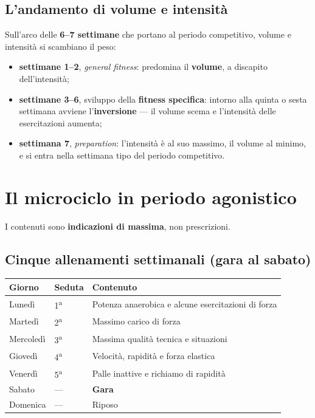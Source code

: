 \subsection{L'andamento di volume e intensità}

Sull'arco delle \textbf{6--7 settimane} che portano al periodo competitivo, volume e intensità si
scambiano il peso:

\begin{itemize}
  \item \textbf{settimane 1--2}, \textit{general fitness}: predomina il \textbf{volume}, a discapito
    dell'intensità;
  \item \textbf{settimane 3--6}, sviluppo della \textbf{fitness specifica}: intorno alla quinta o
    sesta settimana avviene l'\textbf{inversione} --- il volume scema e l'intensità delle
    esercitazioni aumenta;
  \item \textbf{settimana 7}, \textit{preparation}: l'intensità è al suo massimo, il volume al
    minimo, e si entra nella settimana tipo del periodo competitivo.
\end{itemize}

\section{Il microciclo in periodo agonistico}

I contenuti sono \textbf{indicazioni di massima}, non prescrizioni.

\subsection{Cinque allenamenti settimanali (gara al sabato)}

\begin{table}[htbp]
  \centering
  \small
  \renewcommand{\arraystretch}{1.3}
  \begin{tabularx}{\textwidth}{|l|l|X|}
    \hline
    \textbf{Giorno} & \textbf{Seduta} & \textbf{Contenuto} \\
    \hline
    Lunedì & 1\textsuperscript{a} & Potenza anaerobica e alcune esercitazioni di forza \\
    \hline
    Martedì & 2\textsuperscript{a} & Massimo carico di forza \\
    \hline
    Mercoledì & 3\textsuperscript{a} & Massima qualità tecnica e situazioni \\
    \hline
    Giovedì & 4\textsuperscript{a} & Velocità, rapidità e forza elastica \\
    \hline
    Venerdì & 5\textsuperscript{a} & Palle inattive e richiamo di rapidità \\
    \hline
    Sabato & --- & \textbf{Gara} \\
    \hline
    Domenica & --- & Riposo \\
    \hline
  \end{tabularx}
\end{table}

